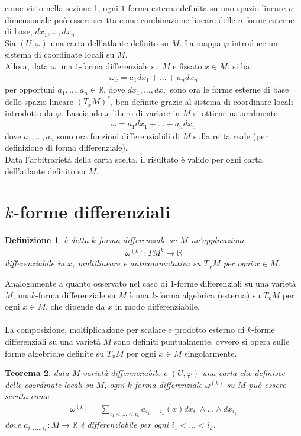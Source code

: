\documentclass[oneside, 11pt]{amsbook}
\makeatletter
\newcommand{\0}{{(0)}}
\newcommand{\3}{{(3)}}
\theoremstyle{colonplain}
\newtheorem{thm}{Teorema}[chapter]
\theoremstyle{colondefinition}
\newtheorem{defn}[thm]{Definizione}
\theoremstyle{colonremark}
\numberwithin{equation}{chapter}
\renewcommand{\proofname}{Dimostrazione}
\renewenvironment{proof}[1][\proofname]{\par
  \pushQED{\qed}%
  \normalfont \topsep6\p@\@plus6\p@\relax
  \trivlist
  \item[\hskip\labelsep\bfseries #1:]\ignorespaces
}{%
  \popQED\endtrivlist\@endpefalse
}
\makeatother
\begin{document}
\begin{proof} come visto nella sezione 1, ogni $1$-forma esterna definita su uno spazio lineare $n$-dimensionale può essere scritta come combinazione lineare delle $n$ forme esterne di base, $dx_1, \dots, dx_n$. \\
Sia $(U, \varphi)$ una carta dell'atlante definito su $M$. La mappa $\varphi$ introduce un sistema di coordinate locali su $M$. \\
Allora, data $\omega$ una $1$-forma differenziale su $M$ e fissato $x \in M$, si ha 
\begin{align}
    \omega_x = a_1dx_1 + \dots + a_ndx_n
\end{align}
per opportuni $a_1, \dots, a_n \in \mathbb{R}$, dove $dx_1, \dots, dx_n$ sono ora le forme esterne di base dello spazio lineare $(T_xM)^*$, ben definite grazie al sistema di coordinare locali introdotto da $\varphi$. Lasciando $x$ libero di variare in $M$ si ottiene naturalmente 
\begin{align}
   \omega = a_1dx_1 + \dots + a_ndx_n
\end{align}
dove $a_1, \dots, a_n$ sono ora funzioni differenziabili di $M$ sulla retta reale (per definizione di forma differenziale). \\
Data l'arbitrarietà della carta scelta, il risultato è valido per ogni carta dell'atlante definito su $M$. \end{proof}

\section{\texorpdfstring{$k$-forme differenziali}{k-forme differenziali}}
\begin{defn} è detta $k$-\textit{forma differenziale} su $M$ un'applicazione 
\begin{align}
   \omega^{(k)} : TM^k \longrightarrow \mathbb{R} 
\end{align}
differenziabile in $x$, multilineare e anticommutativa su $T_xM$ per ogni $x \in M$.
\end{defn}
Analogamente a quanto osservato nel caso di $1$-forme differenziali su una varietà $M$, una$k$-forma differenziale su $M$ è una $k$-forma algebrica (esterna) su $T_xM$ per ogni $x \in M$, che dipende da $x$ in modo differenziabile. \\ \\
La composizione, moltiplicazione per scalare e prodotto esterno di $k$-forme differenziali su una varietà $M$ sono definiti puntualmente, ovvero si opera sulle forme algebriche definite su $T_xM$ per ogni $x \in M$ singolarmente.
\begin{thm} data $M$ varietà differenziabile e $(U, \varphi)$ una carta che definisce delle coordinate locali su $M$, ogni $k$-forma differenziale $\omega^{(k)}$ su $M$ può essere scritta come
\begin{align}
   \omega^{(k)} = \sum_{i_1 < \dots < i_k} a_{i_1, \dots, i_k}(x)dx_{i_1} \wedge \dots \wedge dx_{i_k} 
\end{align}
dove $a_{i_1, \dots, i_k} : M \longrightarrow \mathbb{R}$ è differenziabile per ogni $i_1 < \dots <i_k$.
\end{thm}
\end{document}
